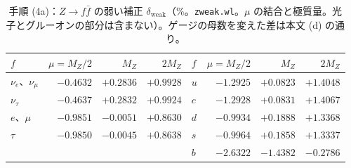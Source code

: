 \documentclass[a4paper,10pt]{ltjsarticle}
\begin{document}
\begin{table}[tbp]
\centering\small
\caption{手順 (4a)：$Z\to f\bar f$ の弱い補正 $\delta_{\mathrm{weak}}$（$\%$。\texttt{zweak.wl}。$\mu$ の結合と極質量。光子とグルーオンの部分は含まない）。ゲージの母数を変えた差は本文 (d) の通り。}
\label{tab:zweak}
\begin{tabular}{lrrr|lrrr}
\toprule
$f$ & $\mu=M_Z/2$ & $M_Z$ & $2M_Z$ & $f$ & $\mu=M_Z/2$ & $M_Z$ & $2M_Z$ \\
\midrule
$\nu_e$、$\nu_\mu$ & $-0.4632$ & $+0.2836$ & $+0.9928$ & $u$ & $-1.2925$ & $+0.0823$ & $+1.4048$ \\
$\nu_\tau$ & $-0.4637$ & $+0.2832$ & $+0.9924$ & $c$ & $-1.2928$ & $+0.0831$ & $+1.4067$ \\
$e$、$\mu$ & $-0.9851$ & $-0.0051$ & $+0.8630$ & $d$ & $-0.9934$ & $+0.1888$ & $+1.3368$ \\
$\tau$ & $-0.9850$ & $-0.0045$ & $+0.8638$ & $s$ & $-0.9964$ & $+0.1858$ & $+1.3337$ \\
 & & & & $b$ & $-2.6322$ & $-1.4382$ & $-0.2786$ \\
\bottomrule
\end{tabular}
\end{table}
\end{document}
